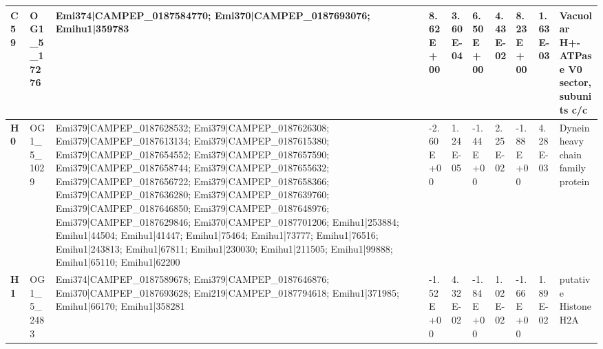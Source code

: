 \begin{landscape}
\begin{center}
\begin{footnotesize}
\begin{longtable}{|p{0.5cm}|p{1.5cm}|p{4cm}|l|l|l|l|l|l|l|}
\textbf{C59} & OG1\_5\_17276 & Emi374|CAMPEP\_0187584770; Emi370|CAMPEP\_0187693076; Emihu1|359783                                                                                                                                                                                                                                                                                                                                                                                                                                                                                                                                                                      & 8.62E+00  & 3.60E-04 & 6.50E+00  & 4.43E-02 & 8.23E+00  & 1.63E-03 & Vacuolar H+-ATPase V0 sector, subunits c/c                                   \\ \hline
\textbf{H0}  & OG1\_5\_1029  & Emi379|CAMPEP\_0187628532; Emi379|CAMPEP\_0187626308; Emi379|CAMPEP\_0187613134; Emi379|CAMPEP\_0187615380; Emi379|CAMPEP\_0187654552; Emi379|CAMPEP\_0187657590; Emi379|CAMPEP\_0187658744; Emi379|CAMPEP\_0187655632; Emi379|CAMPEP\_0187656722; Emi379|CAMPEP\_0187658366; Emi379|CAMPEP\_0187636280; Emi379|CAMPEP\_0187639760; Emi379|CAMPEP\_0187646850; Emi379|CAMPEP\_0187648976; Emi379|CAMPEP\_0187629846; Emi370|CAMPEP\_0187701206; Emihu1|253884; Emihu1|44504; Emihu1|41447; Emihu1|75464; Emihu1|73777; Emihu1|76516; Emihu1|243813; Emihu1|67811; Emihu1|230030; Emihu1|211505; Emihu1|99888; Emihu1|65110; Emihu1|62200 & -2.60E+00 & 1.24E-05 & -1.44E+00 & 2.25E-02 & -1.88E+00 & 4.28E-03 & Dynein heavy chain family protein                                            \\ \hline
\textbf{H1}  & OG1\_5\_2483  & Emi374|CAMPEP\_0187589678; Emi379|CAMPEP\_0187646876; Emi370|CAMPEP\_0187693628; Emi219|CAMPEP\_0187794618; Emihu1|371985; Emihu1|66170; Emihu1|358281                                                                                                                                                                                                                                                                                                                                                                                                                                                                                   & -1.52E+00 & 4.32E-02 & -1.84E+00 & 1.02E-02 & -1.66E+00 & 1.89E-02 & putative Histone H2A                                                         \\ \hline

\end{longtable}
\end{footnotesize}
\end{center}
\end{landscape}
